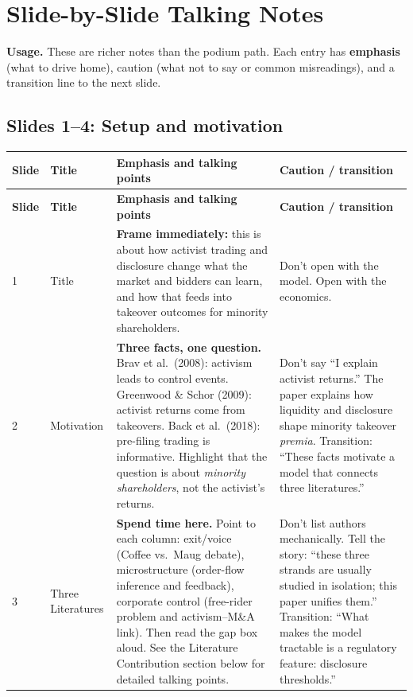 \documentclass[9pt,a4paper]{extarticle}
\newcommand{\say}[1]{\textbf{#1}}
\newcommand{\avoid}[1]{\textcolor{ptrose}{#1}}
\begin{document}
\section{Slide-by-Slide Talking Notes}

\textbf{Usage.} These are richer notes than the podium path. Each entry has \say{emphasis} (what to drive home), \avoid{caution} (what not to say or common misreadings), and a transition line to the next slide.

\subsection{Slides 1--4: Setup and motivation}

{\footnotesize
\begin{longtable}{@{}P{0.06\textwidth}P{0.14\textwidth}P{0.35\textwidth}P{0.37\textwidth}@{}}
\toprule
\textbf{Slide} & \textbf{Title} & \textbf{Emphasis and talking points} & \textbf{Caution / transition} \\
\midrule
\endfirsthead
\toprule
\textbf{Slide} & \textbf{Title} & \textbf{Emphasis and talking points} & \textbf{Caution / transition} \\
\midrule
{} & Title &
\say{Frame immediately:} this is about how activist trading and disclosure change what the market and bidders can learn, and how that feeds into takeover outcomes for minority shareholders. &
\avoid{Don't open with the model.} Open with the economics. \\

2 & Motivation &
\say{Three facts, one question.} Brav et al.\ (2008): activism leads to control events. Greenwood \& Schor (2009): activist returns come from takeovers. Back et al.\ (2018): pre-filing trading is informative. Highlight that the question is about \emph{minority shareholders}, not the activist's returns. &
\avoid{Don't say ``I explain activist returns.''} The paper explains how liquidity and disclosure shape minority takeover \emph{premia}. Transition: ``These facts motivate a model that connects three literatures.'' \\

3 & Three Literatures &
\say{Spend time here.} Point to each column: exit/voice (Coffee vs.\ Maug debate), microstructure (order-flow inference and feedback), corporate control (free-rider problem and activism--M\&A link). Then read the gap box aloud. See the Literature Contribution section below for detailed talking points. &
\avoid{Don't list authors mechanically.} Tell the story: ``these three strands are usually studied in isolation; this paper unifies them.'' Transition: ``What makes the model tractable is a regulatory feature: disclosure thresholds.'' \\


\end{longtable}}
\end{document}
